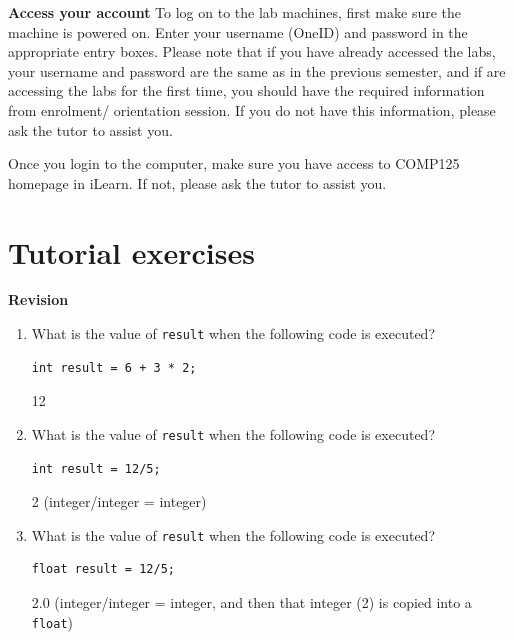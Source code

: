 \vspace{1em}
\begin{questions}

\question  \textbf{Access your account} \vskip 0.5cm
To log on to the lab machines, first make sure the machine is powered on. 
Enter your username (OneID) and password in the appropriate entry boxes. 
Please note that if you have already accessed the labs, your username and password are the same as in the previous semester, and if are accessing the labs for the first time, you should have the required information from enrolment/ orientation session. If you do not have this information, please ask the tutor to assist you.

Once you login to the computer, make sure you have access to COMP125 homepage in iLearn. If not, please ask the tutor to assist you.

\newpage

\section*{Tutorial exercises}

\question  \textbf{Revision} \vskip 0.5cm

\begin{enumerate}
\item What is the value of \texttt{result} when the following code is executed?
\begin{lstlisting}
int result = 6 + 3 * 2;
\end{lstlisting}

\begin{solution}
12
\end{solution}

\item What is the value of \texttt{result} when the following code is executed?
\begin{lstlisting}
int result = 12/5;
\end{lstlisting}

\begin{solution}
2 (integer/integer = integer)
\end{solution}

\item What is the value of \texttt{result} when the following code is executed?
\begin{lstlisting}
float result = 12/5;
\end{lstlisting}

\begin{solution}
2.0 (integer/integer = integer, and then that integer (2) is copied into a \texttt{float})
\end{solution}


\end{enumerate}
\end{questions}
